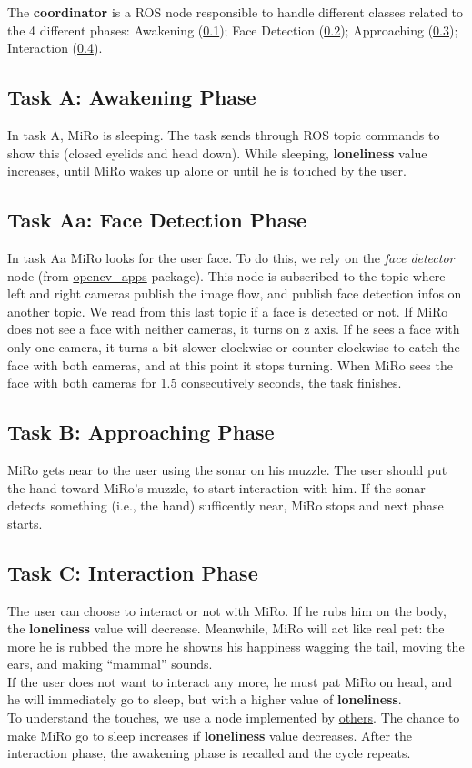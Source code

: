 \documentclass[12pt,peerreviewca, a4paper, onecolumn]{article}
\begin{document}
	\noindent The \textbf{coordinator} is a ROS node responsible to handle different classes related to the 4 different phases: Awakening (\ref{subsec:a}); Face Detection (\ref{subsec:aa}); Approaching (\ref{subsec:b}); Interaction (\ref{subsec:c}).
	\subsection{Task A: Awakening Phase}
	\label{subsec:a}
	In task A, MiRo is sleeping. The task sends through ROS topic commands to show this (closed eyelids and head down). While sleeping, \textbf{loneliness} value increases, until MiRo wakes up alone or until he is touched by the user.
	\subsection{Task Aa: Face Detection Phase}	\label{subsec:aa}
	In task Aa MiRo looks for the user face. To do this, we rely on the \textit{face detector} node  (from \href{http://wiki.ros.org/opencv_apps}{opencv\_apps} package). This node is subscribed to the topic where left and right cameras publish the image flow, and publish face detection infos on another topic. We read from this last topic if a face is detected or not.
	If MiRo does not see a face with neither cameras, it turns on z axis. If he sees a face with only one camera, it turns a bit slower clockwise or counter-clockwise to catch the face with both cameras, and at this point it stops turning. When MiRo sees the face with both cameras for 1.5 consecutively seconds, the task finishes.
	\subsection{Task B: Approaching Phase}	\label{subsec:b}
	MiRo gets near to the user using the sonar on his muzzle. The user should put the hand toward MiRo's muzzle, to start interaction with him. If the sonar detects something (i.e., the hand) sufficently near, MiRo stops and next phase starts.
	\subsection{Task C: Interaction Phase} 	\label{subsec:c} 
	The user can choose to interact or not with MiRo. If he rubs him on the body, the \textbf{loneliness} value will decrease. Meanwhile, MiRo will act like real pet: the more he is rubbed the more he showns his happiness wagging the tail, moving the ears, and making ``mammal'' sounds.\\
	If the user does not want to interact any more, he must pat MiRo on head, and he will immediately go to sleep, but with a higher value of \textbf{loneliness}.\\
	To understand the touches, we use a node implemented by \href{https://github.com/EmaroLab/Miro_SocialRobot/blob/master/README.md}{others}.
	The chance to make MiRo go to sleep increases if \textbf{loneliness} value decreases. After the interaction phase, the awakening phase is recalled and the cycle repeats. 
	
\end{document}
